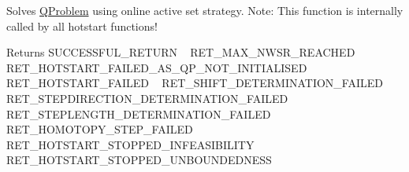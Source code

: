 Solves \hyperlink{class_q_problem}{Q\+Problem} using online active set strategy. Note\+: This function is internally called by all hotstart functions! \begin{DoxyReturn}{Returns}
S\+U\+C\+C\+E\+S\+S\+F\+U\+L\+\_\+\+R\+E\+T\+U\+RN ~\newline
 R\+E\+T\+\_\+\+M\+A\+X\+\_\+\+N\+W\+S\+R\+\_\+\+R\+E\+A\+C\+H\+ED ~\newline
 R\+E\+T\+\_\+\+H\+O\+T\+S\+T\+A\+R\+T\+\_\+\+F\+A\+I\+L\+E\+D\+\_\+\+A\+S\+\_\+\+Q\+P\+\_\+\+N\+O\+T\+\_\+\+I\+N\+I\+T\+I\+A\+L\+I\+S\+ED ~\newline
 R\+E\+T\+\_\+\+H\+O\+T\+S\+T\+A\+R\+T\+\_\+\+F\+A\+I\+L\+ED ~\newline
 R\+E\+T\+\_\+\+S\+H\+I\+F\+T\+\_\+\+D\+E\+T\+E\+R\+M\+I\+N\+A\+T\+I\+O\+N\+\_\+\+F\+A\+I\+L\+ED ~\newline
 R\+E\+T\+\_\+\+S\+T\+E\+P\+D\+I\+R\+E\+C\+T\+I\+O\+N\+\_\+\+D\+E\+T\+E\+R\+M\+I\+N\+A\+T\+I\+O\+N\+\_\+\+F\+A\+I\+L\+ED ~\newline
 R\+E\+T\+\_\+\+S\+T\+E\+P\+L\+E\+N\+G\+T\+H\+\_\+\+D\+E\+T\+E\+R\+M\+I\+N\+A\+T\+I\+O\+N\+\_\+\+F\+A\+I\+L\+ED ~\newline
 R\+E\+T\+\_\+\+H\+O\+M\+O\+T\+O\+P\+Y\+\_\+\+S\+T\+E\+P\+\_\+\+F\+A\+I\+L\+ED ~\newline
 R\+E\+T\+\_\+\+H\+O\+T\+S\+T\+A\+R\+T\+\_\+\+S\+T\+O\+P\+P\+E\+D\+\_\+\+I\+N\+F\+E\+A\+S\+I\+B\+I\+L\+I\+TY ~\newline
 R\+E\+T\+\_\+\+H\+O\+T\+S\+T\+A\+R\+T\+\_\+\+S\+T\+O\+P\+P\+E\+D\+\_\+\+U\+N\+B\+O\+U\+N\+D\+E\+D\+N\+E\+SS 
\end{DoxyReturn}


